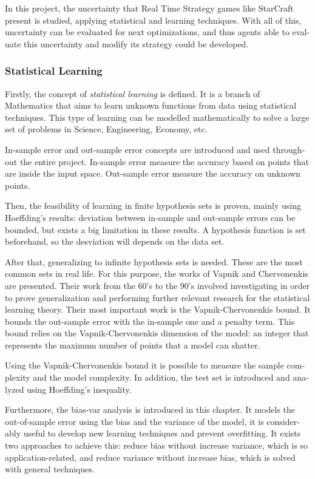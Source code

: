 \begin{otherlanguage}{british}

In this project, the uncertainty that Real Time Strategy games like StarCraft
present is studied, applying statistical and learning techniques.
With all of this, uncertainty can be evaluated for next optimizations,
and thus agents able to evaluate this uncertainty and modify its strategy could
be developed.

\subsubsection*{Statistical Learning}

Firstly, the concept of \emph{statistical learning} is defined. It is a branch
of Mathematics that aims to learn unknown functions from data using statistical
techniques. This type of learning can be modelled mathematically to solve a
large set of problems in Science, Engineering, Economy, etc.

In-sample error and out-sample error concepts are introduced and used
throughout the entire project. In-sample error measure the accuracy based on
points that are inside the input space. Out-sample error measure the accuracy
on unknown points.

Then, the feasibility of learning in finite hypothesis sets is proven, mainly
using Hoeffding’s results: deviation between in-sample and out-sample errors
can be bounded, but exists a big limitation in these results. A hypothesis
function is set beforehand, so the desviation will depends on the data set.

After that, generalizing to infinite hypothesis sets is needed. These are the
most common sets in real life. For this purpose, the works of Vapnik and
Chervonenkis are presented. Their work from the 60’s to the 90’s involved
investigating in order to prove generalization and performing further relevant
research for the statistical learning theory. Their most important work is the
Vapnik-Chervonenkis bound. It bounds the out-sample error with the in-sample
one and a penalty term. This bound relies on the Vapnik-Chervonenkis dimension
of the model: an integer that represents the maximum number of points that a
model can shatter.

Using the Vapnik-Chervonenkis bound it is possible to measure the sample complexity and the
model complexity. In addition, the test set is introduced and analyzed using
Hoeffding's inequality.

Furthermore, the bias-var analysis is introduced in this chapter.
It models the out-of-sample error using the bias and the variance of the model,
it is considerably useful to develop new learning techniques and prevent overfitting.
It exists two approaches to achieve this: reduce bias without increase variance,
which is so application-related, and reduce variance without increase bias,
which is solved with general techniques.


\end{otherlanguage}
